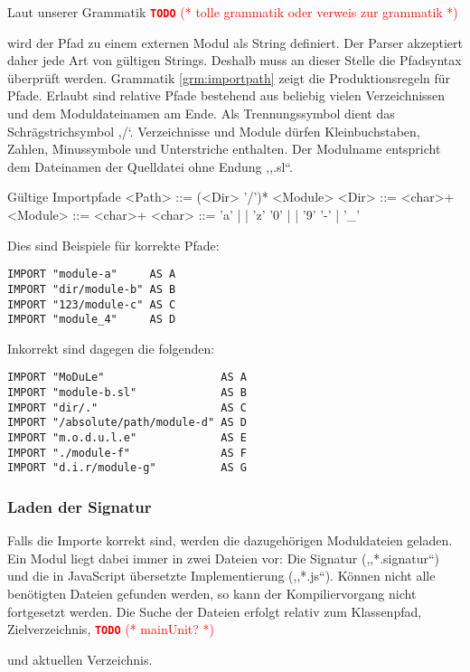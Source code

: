\documentclass[runningheads]{llncs}
\newcommand{\TODO}[1]{ \textcolor{red}{\textbf{\texttt{\large{TODO}}} (* #1 *)}\par}
\begin{document}
Laut unserer Grammatik \TODO{tolle grammatik oder verweis zur grammatik} wird der Pfad zu einem externen Modul als String definiert. Der Parser akzeptiert daher jede Art von gültigen Strings. Deshalb muss an dieser Stelle die Pfadsyntax überprüft werden. Grammatik \ref{grm:importpath} zeigt die Produktionsregeln für Pfade. Erlaubt sind relative Pfade bestehend aus beliebig vielen Verzeichnissen und dem Moduldateinamen am Ende. Als Trennungssymbol dient das Schrägstrichsymbol ,/`. Verzeichnisse und Module dürfen Kleinbuchstaben, Zahlen, Minussymbole und Unterstriche enthalten. Der Modulname entspricht dem Dateinamen der Quelldatei ohne Endung ,,.sl``.

\begin{grammarfigure}{Gültige Importpfade}
  <Path>   ::= (<Dir> '/')* <Module>
  <Dir>    ::= <char>+
  <Module> ::= <char>+
  <char>   ::= 'a' | \cdots | 'z'
          \alt '0' | \cdots | '9'
          \alt '-' | '\_'
\end{grammarfigure}

Dies sind Beispiele für korrekte Pfade:

\begin{verbatim}
IMPORT "module-a"     AS A
IMPORT "dir/module-b" AS B
IMPORT "123/module-c" AS C
IMPORT "module_4"     AS D
\end{verbatim}

Inkorrekt sind dagegen die folgenden:

\begin{verbatim}
IMPORT "MoDuLe"                  AS A
IMPORT "module-b.sl"             AS B
IMPORT "dir/."                   AS C
IMPORT "/absolute/path/module-d" AS D
IMPORT "m.o.d.u.l.e"             AS E
IMPORT "./module-f"              AS F
IMPORT "d.i.r/module-g"          AS G
\end{verbatim}

\subsubsection{Laden der Signatur}

Falls die Importe korrekt sind, werden die dazugehörigen Moduldateien geladen. Ein Modul liegt dabei immer in zwei Dateien vor: Die Signatur (,,*.signatur``) und die in JavaScript übersetzte Implementierung  (,,*.js``). Können nicht alle benötigten Dateien gefunden werden, so kann der Kompiliervorgang nicht fortgesetzt werden. Die Suche der Dateien erfolgt relativ zum Klassenpfad, Zielverzeichnis, \TODO{mainUnit?} und aktuellen Verzeichnis.
\end{document}
